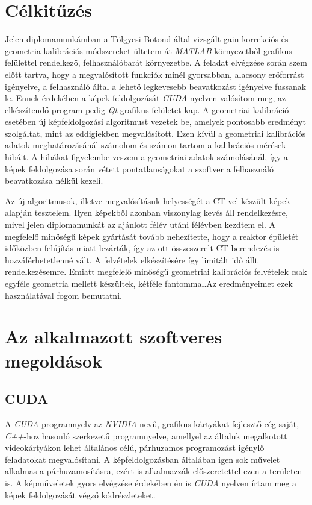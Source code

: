 \documentclass[a4paper,12pt]{article}
\begin{document}
\section{Célkitűzés}


Jelen diplomamunkámban a Tölgyesi Botond által vizsgált gain korrekciós és geometria kalibrációs módszereket ültetem át \emph{MATLAB} környezetből grafikus felülettel rendelkező, felhasználóbarát környezetbe. A feladat elvégzése során szem előtt tartva, hogy a megvalósított funkciók minél gyorsabban, alacsony erőforrást igényelve, a felhasználó által a lehető legkevesebb beavatkozást igényelve fussanak le. Ennek érdekében a képek feldolgozását \emph{CUDA} nyelven valósítom meg, az elkészítendő program pedig \emph{Qt} grafikus felületet kap. A geometriai kalibráció esetében új képfeldolgozási algoritmust vezetek be, amelyek pontosabb eredményt szolgáltat, mint az eddigiekben megvalósított. Ezen kívül a geometriai kalibrációs adatok meghatározásánál számolom és számon tartom a kalibrációs mérések hibáit. A hibákat figyelembe veszem a geometriai adatok számolásánál, így a képek feldolgozása során vétett pontatlanságokat a szoftver a felhasználó beavatkozása nélkül kezeli.


Az új algoritmusok, illetve megvalósításuk helyességét a CT-vel készült képek alapján tesztelem. Ilyen képekből azonban  viszonylag kevés áll rendelkezésre, mivel jelen diplomamunkát az ajánlott félév utáni félévben kezdtem el. A megfelelő minőségű képek gyártását tovább nehezítette, hogy a reaktor épületét időközben felújítás miatt lezárták, így az ott összeszerelt CT berendezés is hozzáférhetetlenné vált. A felvételek elkészítésére így limitált idő állt rendelkezésemre. Emiatt megfelelő minőségű geometriai kalibrációs felvételek csak egyféle geometria mellett készültek, kétféle fantommal.Az eredményeimet ezek használatával fogom bemutatni.





\section{Az alkalmazott szoftveres megoldások}

\subsection{CUDA}
\label{sec:cuda}


A \emph{CUDA} programnyelv az \emph{NVIDIA} nevű, grafikus kártyákat fejlesztő cég saját, \emph{C++}-hoz hasonló szerkezetű programnyelve, amellyel az általuk megalkotott videokártyákon lehet általános célú, párhuzamos programozást igénylő feladatokat megvalósítani. A képfeldolgozásban általában igen sok művelet alkalmas a párhuzamosításra, ezért is alkalmazzák előszeretettel ezen a területen is. A képműveletek gyors elvégzése érdekében én is \emph{CUDA} nyelven írtam meg a képek feldolgozását végző kódrészleteket. 
\end{document}
